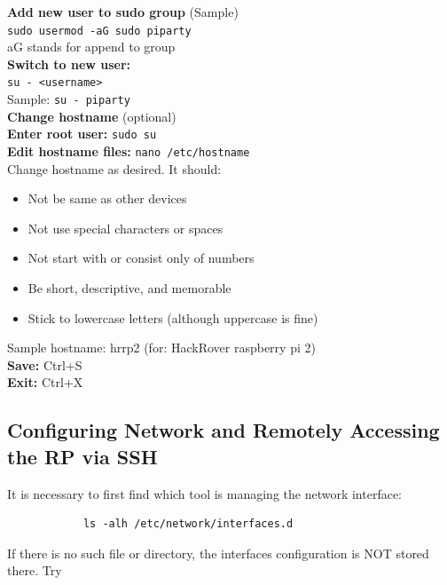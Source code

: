 \documentclass[a4paper, 10pt]{article}
\begin{document}
        \noindent \textbf{Add new user to sudo group} (Sample)\\
        \texttt{sudo usermod -aG sudo piparty} \\
        aG stands for append to group \\
        
        \noindent \textbf{Switch to new user:} \\
        \texttt{su - <username>}\\
        Sample: \texttt{su - piparty} \\
        
        \noindent \textbf{Change hostname }(optional)\\
        \textbf{Enter root user:} \texttt{sudo su} \\
        \textbf{Edit hostname files:} \texttt{nano /etc/hostname} \\
        
        Change hostname as desired. It should:
        \begin{itemize}
            \item Not be same as other devices
            \item Not use special characters or spaces
            \item Not start with or consist only of numbers
            \item Be short, descriptive, and memorable
            \item Stick to lowercase letters (although uppercase is fine)
        \end{itemize}

        
        \noindent Sample hostname: hrrp2 (for:  HackRover raspberry pi 2)\\
         
        \noindent\textbf{Save:} Ctrl+S \\
        \textbf{Exit:} Ctrl+X 

    \subsection{Configuring Network and Remotely Accessing the RP via SSH}
        It is necessary to first find which tool is managing the network interface:
        \begin{lstlisting}
            ls -alh /etc/network/interfaces.d
        \end{lstlisting}
        If there is no such file or directory, the interfaces configuration is NOT stored there. Try
        
\end{document}
